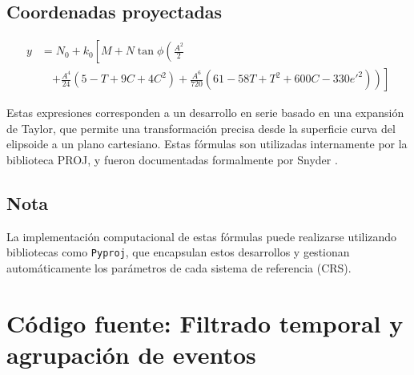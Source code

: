 \documentclass[12pt]{article}
\begin{document}
\subsection*{Coordenadas proyectadas}

\begin{equation}
\begin{split}
y &= N_0 + k_0 \left[ M + N \tan \phi \left( \frac{A^2}{2} \right.\right. \\
&\quad \left.\left. + \frac{A^4}{24}(5 - T + 9C + 4C^2) + \frac{A^6}{720}(61 - 58T + T^2 + 600C - 330e'^2) \right) \right]
\end{split}
\end{equation}

Estas expresiones corresponden a un desarrollo en serie basado en una expansión de Taylor, que permite una transformación precisa desde la superficie curva del elipsoide a un plano cartesiano. Estas fórmulas son utilizadas internamente por la biblioteca PROJ, y fueron documentadas formalmente por Snyder \parencite{snyder1987}.

\subsection*{Nota}

La implementación computacional de estas fórmulas puede realizarse utilizando bibliotecas como \texttt{Pyproj}, que encapsulan estos desarrollos y gestionan automáticamente los parámetros de cada sistema de referencia (CRS).

\section{Código fuente: Filtrado temporal y agrupación de eventos}
\label{annex:filter_code}
\end{document}
